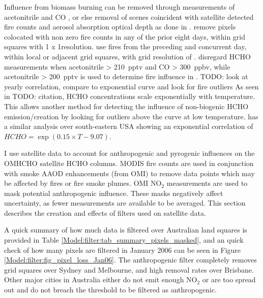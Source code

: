   Influence from biomass burning can be removed through measurements of acetonitrile and CO \parencite[e.g.,][]{Wolfe2016, Miller2017}, or else removal of scenes coincident with satellite detected fire counts and aerosol absorption optical depth as done in \textcite{Marais2014}.
  \textcite{Marais2012} remove pixels colocated with non zero fire counts in any of the prior eight days, within grid squares with 1 x 1\degr resolution.
  \textcite{Barkley2013} use fires from the preceding and concurrent day, within local or adjacent grid squares, with grid resolution of \highhr.
  \textcite{Wolfe2016} disregard HCHO measurements when acetonitrile > 210~pptv and CO > 300~ppbv, while acetonitrile > 200~pptv is used to determine fire influence in \textcite{Miller2017}.
  TODO: look at yearly correlation, compare to exponential curve and look for fire outliers
  As seen in TODO: citation, HCHO concentrations scale exponentially with temperature.
  This allows another method for detecting the influence of non-biogenic HCHO emission/creation by looking for outliers above the curve at low temperature.
  \textcite{Zhu2013_poster} has a similar analysis over south-eastern USA showing an exponential correlation of ${HCHO} = \exp(0.15\times{T}-9.07)$.
  
  I use satellite data to account for anthropogenic and pyrogenic influences on the OMHCHO satellite HCHO columns.
  MODIS fire counts are used in conjunction with smoke AAOD enhancements (from OMI) to remove data points which may be affected by fires or fire smoke plumes.
  OMI NO$_2$ measurements are used to mask potential anthropogenic influence.  
  These masks negatively affect uncertainty,  as fewer measurements are available to be averaged.
  This section describes the creation and effects of filters used on satellite data.
  
  A quick summary of how much data is filtered over Australian land squares is provided in Table \ref{Model:filter:tab_summary_pixels_masked}, and an quick check of how many pixels are filtered in January 2006 can be seen in Figure \ref{Model:filter:fig_pixel_loss_Jan06}.
  The anthropogenic filter completely removes grid squares over Sydney and Melbourne, and high removal rates over Brisbane. 
  Other major cities in Australia either do not emit enough NO$_2$ or are too spread out and do not breach the threshold to be filtered as anthropogenic.
  
